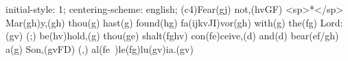 initial-style: 1;
centering-scheme: english;
(c4)Fear(gj) not,(hvGF) <sp>*</sp> Mar(gh)y,(gh) thou(g) hast(g) found(hg) fa(ijkvJI)vor(gh) with(g) the(fg) Lord:(gv) (;) be(hv)hold,(g) thou(ge) shalt(fghv) con(fe)ceive,(d) and(d) bear(ef/gh) a(g) Son,(gvFD) (,) al(fe~)le(fg)lu(gv)ia.(gv)

